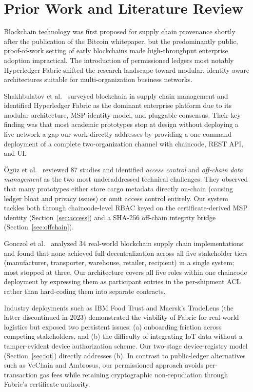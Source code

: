 \documentclass[conference]{IEEEtran}
\begin{document}
\section{Prior Work and Literature Review}

Blockchain technology was first proposed for supply chain provenance
shortly after the publication of the Bitcoin whitepaper, but the
predominantly public, proof-of-work setting of early blockchains made
high-throughput enterprise adoption impractical.  The introduction of
permissioned ledgers   most notably Hyperledger Fabric  shifted the
research landscape toward modular, identity-aware architectures suitable
for multi-organization business networks.

Shakhbulatov et al.\ \cite{shakhbulatov2020} surveyed blockchain in supply
chain management and identified Hyperledger Fabric as the dominant enterprise
platform due to its modular architecture, MSP identity model, and
pluggable consensus.  Their key finding was that most academic prototypes
stop at design without deploying a live network  a gap our work
directly addresses by providing a one-command deployment of a complete
two-organization channel with chaincode, REST API, and UI.

\"{O}g\"{u}z et al.\ \cite{oguz2024} reviewed 87 studies and identified
\textit{access control} and \textit{off-chain data management} as the two
most underaddressed technical challenges.  They observed that many
prototypes either store cargo metadata directly on-chain (causing ledger
bloat and privacy issues) or omit access control entirely.  Our system
tackles both through chaincode-level RBAC keyed on the certificate-derived
MSP identity (Section~\ref{sec:access}) and a SHA-256 off-chain integrity
bridge (Section~\ref{sec:offchain}).

Gonczol et al.\ \cite{gonczol2020} analyzed 34 real-world blockchain supply
chain implementations and found that none achieved full decentralization
across all five stakeholder tiers (manufacturer, transporter, warehouse,
retailer, recipient) in a single system; most stopped at three.  Our
architecture covers all five roles within one chaincode deployment by
expressing them as participant entries in the per-shipment ACL rather than
hard-coding them into separate contracts.

Industry deployments such as IBM Food Trust and Maersk's TradeLens (the
latter discontinued in 2023) demonstrated the viability of Fabric for
real-world logistics but exposed two persistent issues: (a) onboarding
friction across competing stakeholders, and (b) the difficulty of
integrating IoT data without a tamper-evident device authorization scheme.
Our two-stage device-registry model (Section~\ref{sec:iot}) directly
addresses (b).  In contrast to public-ledger alternatives such as VeChain
and Ambrosus, our permissioned approach avoids per-transaction gas fees
while retaining cryptographic non-repudiation through Fabric's certificate
authority.
\end{document}
